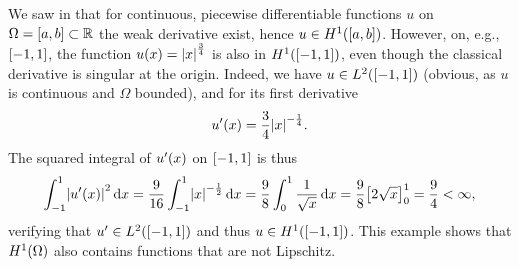 \begin{example}
	We saw in that for continuous, piecewise differentiable functions \(u\) on \(\Omega = \brackets*{a, b} \subset \R\) the weak derivative exist, hence \(u \in H^1\parentheses*{\brackets*{a, b}}\).
	However, on, e.g., \(\brackets*{-1, 1}\), the function \(u\parentheses*{x} = \absolute*{x}^{\frac{3}{4}}\) is also in \(H^1\parentheses*{\brackets*{-1, 1}}\), even though the classical derivative is singular at the origin.
	Indeed, we have \(u \in L^2\parentheses*{\brackets*{-1, 1}}\) (obvious, as \(u\) is continuous and \(\Omega\) bounded), and for its first derivative
	\[
		u'\parentheses*{x} = \frac{3}{4}\absolute*{x}^{-\frac{1}{4}}.
	\]
	The squared integral of \(u'\parentheses*{x}\) on \(\brackets*{-1, 1}\) is thus
	\[
		\int_{-1}^1 \absolute*{u'\parentheses*{x}}^2 \d x = \frac{9}{16}\int_{-1}^1 \absolute*{x}^{-\frac{1}{2}}\d x = \frac{9}{8}\int_0^1 \frac{1}{\sqrt{x}}\d x = \frac{9}{8}\brackets*{2\sqrt{x}}_0^1 = \frac{9}{4} < \infty,
	\]
	verifying that \(u' \in L^2\parentheses*{\brackets*{-1, 1}}\) and thus \(u \in H^1\parentheses*{\brackets*{-1, 1}}\).
	This example shows that \(H^1\parentheses*{\Omega}\) also contains functions that are not Lipschitz.
\end{example}


